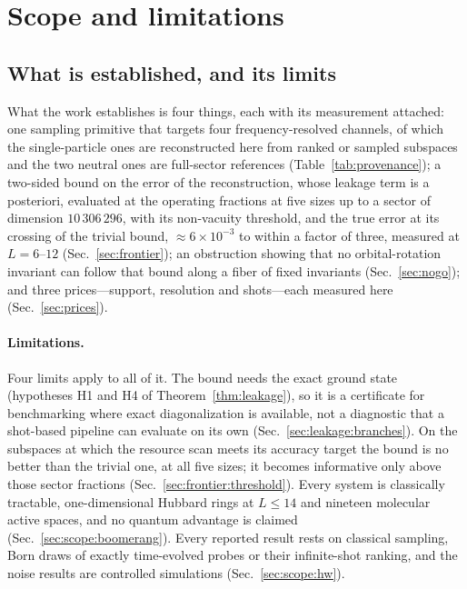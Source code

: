 \section{Scope and limitations}
\label{sec:scope}\label{sec:honest}

\subsection{What is established, and its limits}
\label{sec:scope:declared}

%
%
%
%
%
What the work establishes is four things, each with its measurement attached: one sampling primitive that targets four frequency-resolved channels, of which the single-particle ones are reconstructed here from ranked or sampled subspaces and the two neutral ones are full-sector references (Table~\ref{tab:provenance}); a
two-sided bound on the error of the reconstruction, whose leakage term is a posteriori, evaluated at
the operating fractions at five sizes up to a sector of dimension $10\,306\,296$, with its
non-vacuity threshold, and the true error at its crossing of the trivial bound,
${\approx}6\times10^{-3}$ to within a factor of three, measured at $L=6$--$12$
(Sec.~\ref{sec:frontier}); an
obstruction showing that no orbital-rotation invariant can follow that bound along a fiber of fixed
invariants (Sec.~\ref{sec:nogo}); and three prices---support, resolution and shots---each measured here (Sec.~\ref{sec:prices}).

\paragraph{Limitations.} Four limits apply to all of it. The bound needs the exact ground state
(hypotheses H1 and H4 of Theorem~\ref{thm:leakage}), so it is a certificate for benchmarking where
exact diagonalization is available, not a diagnostic that a shot-based pipeline can evaluate on its
own (Sec.~\ref{sec:leakage:branches}). On the subspaces at which the resource scan meets its accuracy
target the bound is no better than the trivial one, at all five sizes; it becomes informative only
above those sector fractions (Sec.~\ref{sec:frontier:threshold}). Every system is classically
tractable, one-dimensional Hubbard rings at $L\le14$ and nineteen molecular active spaces, and no
quantum advantage is claimed (Sec.~\ref{sec:scope:boomerang}). Every reported result rests on
classical sampling, Born draws of exactly time-evolved probes or their infinite-shot ranking, and the
noise results are controlled simulations (Sec.~\ref{sec:scope:hw}).

